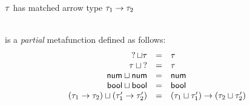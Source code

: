 \documentclass{article}
\begin{document}
 $\TMV$ has matched arrow type $\TArrow{\TMV_1}{\TMV_2}$
%
\begin{mathpar}

\end{mathpar} \\

 is a \emph{partial} metafunction defined as follows:
%
\newcommand{\joinsTo}[3]{\ensuremath{\TJoin{#1}{#2} & = & #3}}
\[\begin{array}{rcl}
  \joinsTo{\TUnknown}{\TMV}{\TMV} \\
  \joinsTo{\TMV}{\TUnknown}{\TMV} \\
  \joinsTo{\TNum}{\TNum}{\TNum} \\
  \joinsTo{\TBool}{\TBool}{\TBool} \\
  \joinsTo{(\TArrow{\TMV_1}{\TMV_2})}{(\TArrow{\TMV_1'}{\TMV_2'})}{\TArrow{(\TJoin{\TMV_1}{\TMV_1'})}{(\TJoin{\TMV_2}{\TMV_2'})}} \\
\end{array}\]
\end{document}
